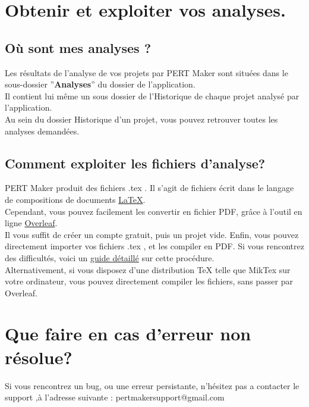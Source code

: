 \documentclass{article}
\begin{document}
\section{Obtenir et exploiter vos analyses.}
\subsection{Où sont mes analyses ?}
Les résultats de l'analyse de vos projets par PERT Maker sont situées dans le sous-dossier
''\textbf{Analyses}'' du dossier de l'application. \\
Il contient lui même un sous dossier de l'Historique de chaque projet analysé par l'application.\\
Au sein du dossier Historique d'un projet, vous pouvez retrouver toutes les analyses demandées.
\subsection{Comment exploiter les fichiers d'analyse?}
PERT Maker produit des fichiers .tex .
Il s'agit de fichiers écrit dans le langage de compositions de documents \textcolor{blue}{\href{https://fr.wikipedia.org/wiki/LaTeX}{\LaTeX}}. \\ 
Cependant, vous pouvez facilement les convertir en fichier PDF, grâce à l'outil en ligne \textcolor{blue}{\href{https://www.overleaf.com/}{Overleaf}}.\\
Il vous suffit de créer un compte gratuit, puis un projet vide. Enfin, vous pouvez directement importer
vos fichiers .tex , et les compiler en PDF.
Si vous rencontrez des difficultés, voici un \textcolor{blue}{\href{https://shorturl.at/ersu1}{guide détaillé}}
sur cette procédure.\\
Alternativement, si vous disposez d'une distribution TeX telle que MikTex sur votre ordinateur,
vous pouvez directement compiler les fichiers, sans passer par Overleaf.

\section{Que faire en cas d'erreur non résolue?}
Si vous rencontrez un bug, ou une erreur persistante, n'hésitez pas a contacter le support ,à l'adresse suivante :
pertmakersupport@gmail.com
\end{document}
